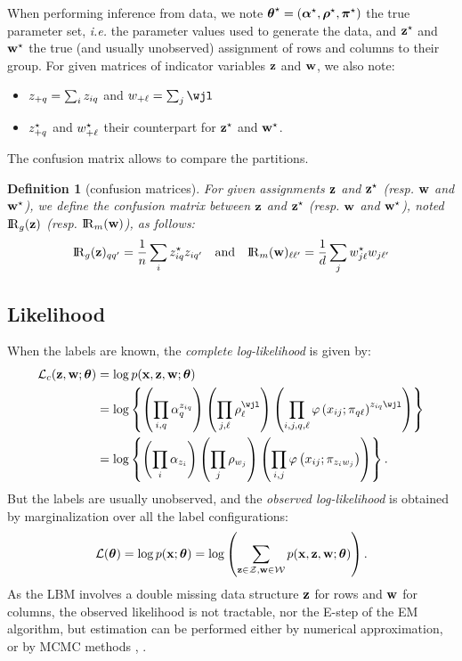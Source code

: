 \documentclass[bj]{imsart}
\numberwithin{equation}{section}
\theoremstyle{plain}
\newtheorem{dof}[thm]{Definition}
\theoremstyle{remark}
\begin{document}
When performing inference from data, we note $\boldsymbol{\theta}^\star = (\boldsymbol{\alpha}^\star, \boldsymbol{\rho}^\star, \boldsymbol{\pi}^\star)$ the true parameter set, \emph{i.e.} the parameter values used to generate the data, and $\mathbf{z}^\star$ and $\mathbf{w}^\star$ the true (and usually unobserved) assignment of rows and columns to their group.
 For given matrices of indicator variables $\mathbf{z}$ and $\mathbf{w}$, we also note:
\begin{itemize}
\item $z_{+q} = \sum_{i} z_{iq}$ and $\wsuml = \sum_{\jj} \wjl$
\item $z^{\star}_{+q}$ and $w^{\star}_{+\ell}$ their counterpart for $\mathbf{z}^\star$ and $\mathbf{w}^\star$.
\end{itemize}
The confusion matrix allows to compare the partitions.
\begin{dof}[confusion matrices]
  \label{def:confusion}
  For given assignments $\mathbf{z}$ and $\mathbf{z}^\star$ (resp. $\mathbf{w}$ and $\mathbf{w}^\star$), we define the \emph{confusion matrix} between $\mathbf{z}$ and $\mathbf{z}^\star$ (resp. $\mathbf{w}$ and $\mathbf{w}^\star$), noted $\Rgbz$ (resp. $\Rmbw$), as follows:
  \begin{equation}
    \label{eq:confusion-matrices}
    \Rgbz_{\kk\kp} = \frac{1}{\n} \sum_{\ii} \z^\vrai_{\ii\kk} \z_{\ii\kp} \quad \text{and} \quad \Rmbw_{\el\lp} = \frac{1}{\dd} \sum_{\jj} \w^\vrai_{\jj\el} \w_{\jj\lp}
  \end{equation}
\end{dof}

\subsection{Likelihood}
When the labels are known, the {\em complete log-likelihood} is given by:
\begin{equation}
  \label{eq:log-vraisemblance-complete}
  \begin{aligned}
    \Lc(\bz,\bw;\btheta)&= \log\prob(\bx,\bz,\bw;\btheta)\\
    &= \log\left\{ \left(\prodik{\pik^{\zik}}\right)\left(\prodjl{\rhol^{\wjl}}\right)\left(\prodijkl{\dens\left(\xij;\alkl\right)^{\zik\wjl}}\right) \right\}\\
    &= \log\left\{ \left(\prodi{\pii_{\zi}}\right)\left(\prodj{\rhoo_{\wj}}\right)\left(\prodij{\dens\left(\xij;\al_{\zi\wj}\right)}\right) \right\}.	\\
  \end{aligned}
\end{equation}
But the labels are usually unobserved, and the {\em observed log-likelihood} is obtained by marginalization over all the label configurations:
\begin{equation}
  \label{eq:log-vraisemblance-observee}
  \LL(\btheta)=\log\prob(\bx;\btheta) = \log \left( \sum_{\bz \in \mcZ, \bw \in \mcW}\prob(\bx,\bz,\bw;\btheta) \right).
\end{equation}
As the LBM involves a double missing data structure $\mathbf{z}$ for rows  and $\mathbf{w}$ for columns, the observed likelihood is not tractable, nor the E-step of the EM algorithm, but estimation can be performed either by numerical approximation, or by MCMC methods \cite{keribin2015estimation}, \cite{govaert2013co}.
\end{document}
